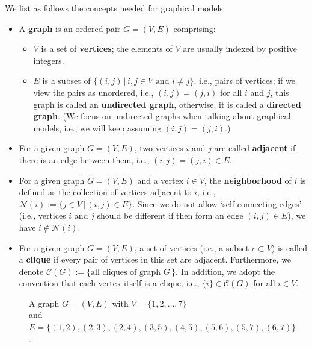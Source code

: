 \documentclass[11pt,letterpaper, leqno]{article}
\numberwithin{equation}{section}
\numberwithin{theorem}{section}
\numberwithin{lemma}{section}
\numberwithin{corollary}{section}
\numberwithin{definition}{section}
\numberwithin{proposition}{section}
\numberwithin{remark}{section}
\numberwithin{example}{section}
\begin{document}
We list as follows the concepts needed for graphical models
\begin{itemize}
    \item A \textbf{graph} is an ordered pair $G=(V,E)$ comprising:
    \begin{itemize}
        \item $V$ is a set of \textbf{vertices}; the elements of $V$ are usually indexed by positive integers.
        \item $E$ is a subset of $\{(i,j) \,\vert\, i,j\in V \mbox{ and }i\ne j\}$, i.e., pairs of vertices; if we view the pairs as unordered, i.e., $(i,j)=(j,i)$ for all $i$ and $j$, this graph is called an \textbf{undirected graph}, otherwise, it is called a \textbf{directed graph}. (We focus on undirected graphs when talking about graphical models, i.e., we will keep assuming $(i,j)=(j,i)$.) 
    \end{itemize}
    
    \item For a given graph $G=(V,E)$, two vertices $i$ and $j$ are called \textbf{adjacent} if there is an edge between them, i.e., $(i,j)=(j,i)\in E$.
    
    \item For a given graph $G=(V,E)$ and a vertex $i\in V$, the \textbf{neighborhood} of $i$ is defined as the collection of vertices adjacent to $i$, i.e., $\mathcal{N}(i):=\{j\in V \,\vert\, (i,j)\in E\}$. Since we do not allow `self connecting edges' (i.e., vertices $i$ and $j$ should be different if then form an edge $(i,j)\in E$), we have $i\notin \mathcal{N}(i)$.
    
    \item For a given graph $G=(V,E)$, a set of vertices (i.e., a subset $c\subset V$) is called a \textbf{clique} if every pair of vertices in this set are adjacent. Furthermore, we denote $\mathcal{C}(G):=\{\mbox{all cliques of graph }G\,\}$. In addition, we adopt the convention that each vertex itself is a clique, i.e., $\{i\}\in\mathcal{C}(G)$ for all $i\in V$.
\end{itemize}
\begin{figure}[H]
    \centering
    \caption{A graph $G=(V,E)$ with $V=\{1,2,\ldots,7\}$\\ and $E=\{(1,2), (2,3), (2,4), (3,5), (4,5), (5,6), (5,7), (6,7)\}$.}\label{fig: graph example}
\end{figure}
\end{document}
